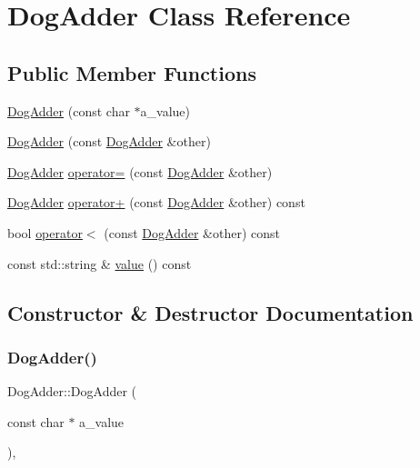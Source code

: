 \hypertarget{classDogAdder}{}\section{Dog\+Adder Class Reference}
\label{classDogAdder}
\subsection*{Public Member Functions}
\begin{DoxyCompactItemize}
\item 
\mbox{\hyperlink{classDogAdder_a7fd76a2078834dc255c7dd7ac7c58f32}{Dog\+Adder}} (const char $\ast$a\+\_\+value)
\item 
\mbox{\hyperlink{classDogAdder_a35bb24b649b63f38784dcb44d55c4d94}{Dog\+Adder}} (const \mbox{\hyperlink{classDogAdder}{Dog\+Adder}} \&other)
\item 
\mbox{\hyperlink{classDogAdder}{Dog\+Adder}} \mbox{\hyperlink{classDogAdder_a13bd773069c15b083f876b8afd512247}{operator=}} (const \mbox{\hyperlink{classDogAdder}{Dog\+Adder}} \&other)
\item 
\mbox{\hyperlink{classDogAdder}{Dog\+Adder}} \mbox{\hyperlink{classDogAdder_ad667166cdafb4352396e910faf09a55f}{operator+}} (const \mbox{\hyperlink{classDogAdder}{Dog\+Adder}} \&other) const
\item 
bool \mbox{\hyperlink{classDogAdder_a6d87d3ee06c0167e7552ba83daa629e7}{operator$<$}} (const \mbox{\hyperlink{classDogAdder}{Dog\+Adder}} \&other) const
\item 
const std\+::string \& \mbox{\hyperlink{classDogAdder_a76bb9e42f79e9d4adacd9e48a3a3c9fb}{value}} () const
\end{DoxyCompactItemize}


\subsection{Constructor \& Destructor Documentation}
\mbox{\label{classDogAdder_a7fd76a2078834dc255c7dd7ac7c58f32}} 
\subsubsection{\texorpdfstring{DogAdder()}{DogAdder()}\hspace{0.1cm}{\footnotesize\ttfamily [1/2]}}
{\footnotesize\ttfamily Dog\+Adder\+::\+Dog\+Adder (\begin{DoxyParamCaption}\item[{const char $\ast$}]{a\+\_\+value }\end{DoxyParamCaption})\hspace{0.3cm}{\ttfamily [inline]}, {\ttfamily [explicit]}}

